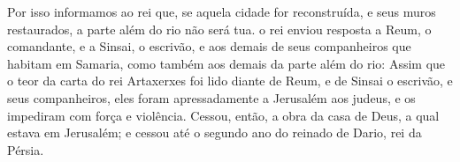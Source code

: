 {{  Por isso informamos ao rei que, se aquela cidade for reconstruída, e seus muros restaurados, a parte além do rio não será tua}.
   o rei enviou {} resposta a Reum, o comandante, e a Sinsai, o escrivão, e aos demais de seus companheiros que habitam em Samaria, como também aos demais da parte além do rio: 
  Assim que o teor da carta do rei Artaxerxes foi lido diante de Reum, e de Sinsai o escrivão, e seus companheiros, eles foram apressadamente a Jerusalém aos judeus, e os impediram com força e violência.
  Cessou, então, a obra da casa de Deus, a qual estava em Jerusalém; e cessou até o segundo ano do reinado de Dario, rei da Pérsia.
\par }

